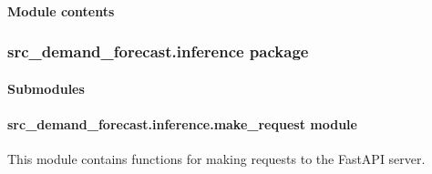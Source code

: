 \documentclass[letterpaper,10pt,english]{sphinxmanual}
\begin{document}
\begin{fulllineitems}
\label{\detokenize{src_demand_forecast.features:src_demand_forecast.features.build_transformer.save_transformed_data}}
\pysigstartsignatures
{}
\pysigstopsignatures
\end{fulllineitems}



\paragraph{Module contents}
\label{\detokenize{src_demand_forecast.features:module-src_demand_forecast.features}}\label{\detokenize{src_demand_forecast.features:module-contents}}
\sphinxstepscope


\subsubsection{src\_demand\_forecast.inference package}
\label{\detokenize{src_demand_forecast.inference:src-demand-forecast-inference-package}}\label{\detokenize{src_demand_forecast.inference::doc}}

\paragraph{Submodules}
\label{\detokenize{src_demand_forecast.inference:submodules}}

\paragraph{src\_demand\_forecast.inference.make\_request module}
\label{\detokenize{src_demand_forecast.inference:module-src_demand_forecast.inference.make_request}}\label{\detokenize{src_demand_forecast.inference:src-demand-forecast-inference-make-request-module}}
\sphinxAtStartPar
This module contains functions for making requests to the FastAPI server.
\end{document}
